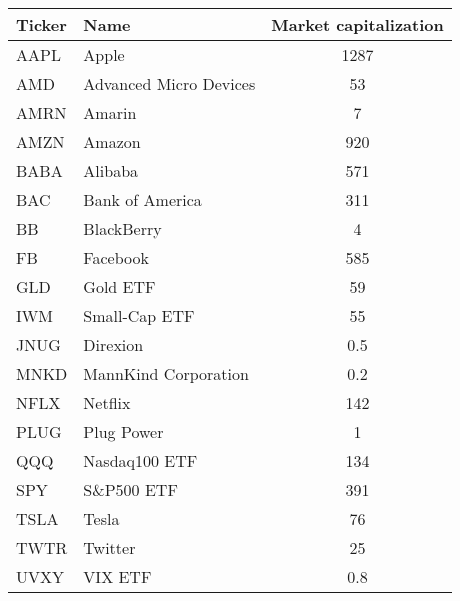 \begin{table}[h]
\centering
\begin{tabular}{l|l|c}
Ticker & Name                    & Market capitalization\\ \hline \hline
AAPL   & Apple                   & 1287\\
AMD    & Advanced Micro Devices  & 53 \\
AMRN   & Amarin                  & 7 \\
AMZN   & Amazon                  & 920 \\
BABA   & Alibaba                 & 571 \\
BAC    & Bank of America         & 311 \\
BB     & BlackBerry              & 4 \\
FB     & Facebook                & 585 \\
GLD    & Gold ETF                & 59 \\
IWM    & Small-Cap ETF           & 55 \\
JNUG   & Direxion                & 0.5 \\
MNKD   & MannKind Corporation    & 0.2 \\
NFLX   & Netflix                 & 142 \\
PLUG   & Plug Power              & 1 \\
QQQ    & Nasdaq100 ETF           & 134\\
SPY    & S\&P500 ETF             & 391 \\
TSLA   & Tesla                   & 76 \\
TWTR   & Twitter                 & 25 \\
UVXY   & VIX ETF                 & 0.8 \\
\end{tabular}
\label{tab:listcov}
\end{table}

%

\newpage
